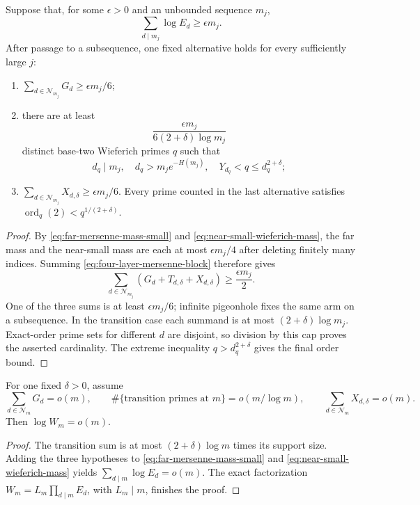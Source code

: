 \begin{theorem}
\label{thm:global-mersenne-three-arm-obstruction}
Suppose that, for some $\epsilon>0$ and an unbounded sequence $m_j$,
\[
                 \sum_{d\mid m_j}\log E_d\ge\epsilon m_j.
\]
After passage to a subsequence, one fixed alternative holds for every
sufficiently large $j$:
\begin{enumerate}
\item
$\sum_{d\in\mathcal N_{m_j}}G_d\ge\epsilon m_j/6$;
\item there are at least
\[
 \frac{\epsilon m_j}{6(2+\delta)\log m_j}
\]
distinct base-two Wieferich primes $q$ such that
\[
 d_q\mid m_j,\quad d_q>m_je^{-H(m_j)},\quad
 Y_{d_q}<q\le d_q^{2+\delta};
\]
\item
$\sum_{d\in\mathcal N_{m_j}}X_{d,\delta}\ge\epsilon m_j/6$.
Every prime counted in the last alternative satisfies
$\operatorname{ord}_q(2)<q^{1/(2+\delta)}$.
\end{enumerate}
\end{theorem}

\begin{proof}
By \eqref{eq:far-mersenne-mass-small} and
\eqref{eq:near-small-wieferich-mass}, the far mass and the near-small mass
are each at most $\epsilon m_j/4$ after deleting finitely many indices.
Summing \eqref{eq:four-layer-mersenne-block} therefore gives
\[
 \sum_{d\in\mathcal N_{m_j}}
   (G_d+T_{d,\delta}+X_{d,\delta})\ge\frac{\epsilon m_j}{2}.
\]
One of the three sums is at least $\epsilon m_j/6$; infinite pigeonhole
fixes the same arm on a subsequence.  In the transition case each summand is
at most $(2+\delta)\log m_j$.  Exact-order prime sets for different $d$ are
disjoint, so division by this cap proves the asserted cardinality.  The
extreme inequality $q>d_q^{2+\delta}$ gives the final order bound.
\end{proof}

\begin{corollary}
\label{cor:three-aggregate-mersenne-gates}
For one fixed $\delta>0$, assume
\[
 \sum_{d\in\mathcal N_m}G_d=o(m),\qquad
 \#\{\text{transition primes at }m\}=o(m/\log m),
 \qquad
 \sum_{d\in\mathcal N_m}X_{d,\delta}=o(m).
\]
Then $\log W_m=o(m)$.
\end{corollary}

\begin{proof}
The transition sum is at most $(2+\delta)\log m$ times its support size.
Adding the three hypotheses to
\eqref{eq:far-mersenne-mass-small} and
\eqref{eq:near-small-wieferich-mass} yields
$\sum_{d\mid m}\log E_d=o(m)$.  The exact factorization
$W_m=L_m\prod_{d\mid m}E_d$, with $L_m\mid m$, finishes the proof.
\end{proof}

